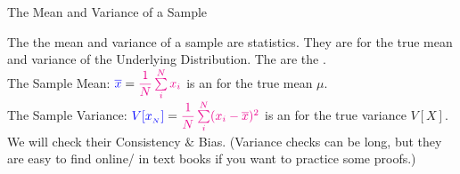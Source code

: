 \documentclass[10pt,sans,english,compress,xcolor=dvipsnames]{beamer}
\begin{document}
\begin{frame}{The Mean and Variance of a Sample}

\footnotesize
The  the mean and variance of a sample are statistics. They are  for the true mean and variance of the Underlying Distribution. The  are the .\\[2ex]

The Sample Mean: $\textcolor{blue}{ \overline{x} }= \textcolor{magenta}{ \dfrac{1}{N} \sum\limits_i^N x_i}$ is an  for the true mean $\mu$.  \\[1ex]



The Sample Variance: $\textcolor{blue}{V[x_{_{N}}] }= \textcolor{magenta}{ \dfrac{1}{N} \sum\limits_i^N (x_i-\overline{x})^2}$ is an  for the true variance $V[X]$.  \\[1ex]



We will check their Consistency $\&$ Bias. (Variance checks can be long, but they are easy to find online/ in text books if you want to practice some proofs.)
\end{frame} 
\end{document}

